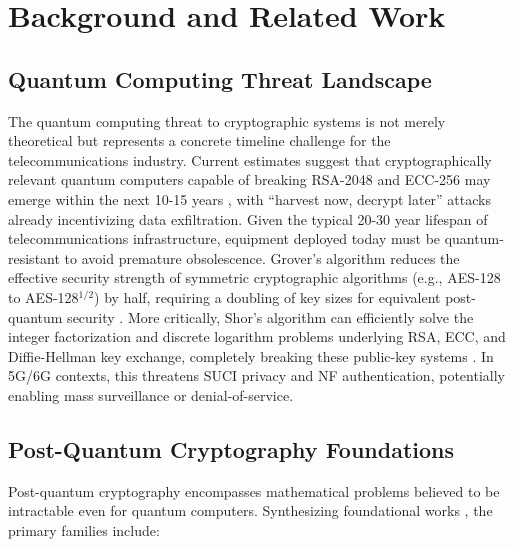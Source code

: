 \documentclass[11pt,a4paper]{article}
\begin{document}
\section{Background and Related Work}

\subsection{Quantum Computing Threat Landscape}

The quantum computing threat to cryptographic systems is not merely theoretical but represents a concrete timeline challenge for the telecommunications industry. Current estimates suggest that cryptographically relevant quantum computers capable of breaking RSA-2048 and ECC-256 may emerge within the next 10-15 years \cite{mosca2018}, with ``harvest now, decrypt later'' attacks already incentivizing data exfiltration. Given the typical 20-30 year lifespan of telecommunications infrastructure, equipment deployed today must be quantum-resistant to avoid premature obsolescence. Grover's algorithm reduces the effective security strength of symmetric cryptographic algorithms (e.g., AES-128 to AES-128$^{1/2}$) by half, requiring a doubling of key sizes for equivalent post-quantum security \cite{grover1996}. More critically, Shor's algorithm can efficiently solve the integer factorization and discrete logarithm problems underlying RSA, ECC, and Diffie-Hellman key exchange, completely breaking these public-key systems \cite{shor1994}. In 5G/6G contexts, this threatens SUCI privacy and NF authentication, potentially enabling mass surveillance or denial-of-service.

\subsection{Post-Quantum Cryptography Foundations}

Post-quantum cryptography encompasses mathematical problems believed to be intractable even for quantum computers. Synthesizing foundational works \cite{nguyen2024}, the primary families include:
\end{document}
